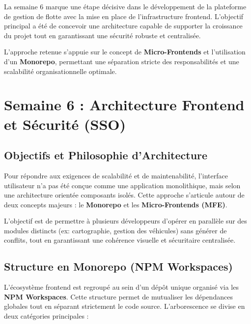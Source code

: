 \documentclass[12pt,a4paper]{article}
\begin{document}
La semaine 6 marque une \'{e}tape d\'{e}cisive dans le d\'{e}veloppement de la plateforme de gestion de flotte avec la mise en place de l'infrastructure frontend. L'objectif principal a \'{e}t\'{e} de concevoir une architecture capable de supporter la croissance du projet tout en garantissant une s\'{e}curit\'{e} robuste et centralis\'{e}e.

L'approche retenue s'appuie sur le concept de \textbf{Micro-Frontends} et l'utilisation d'un \textbf{Monorepo}, permettant une s\'{e}paration stricte des responsabilit\'{e}s et une scalabilit\'{e} organisationnelle optimale.

\section{Semaine 6 : Architecture Frontend et S\'{e}curit\'{e} (SSO)}

\subsection{Objectifs et Philosophie d'Architecture}

Pour r\'{e}pondre aux exigences de scalabilit\'{e} et de maintenabilit\'{e}, l'interface utilisateur n'a pas \'{e}t\'{e} con\c{c}ue comme une application monolithique, mais selon une architecture orient\'{e}e composants isol\'{e}s. Cette approche s'articule autour de deux concepts majeurs : le \textbf{Monorepo} et les \textbf{Micro-Frontends (MFE)}.

L'objectif est de permettre \`{a} plusieurs d\'{e}veloppeurs d'op\'{e}rer en parall\`{e}le sur des modules distincts (ex: cartographie, gestion des v\'{e}hicules) sans g\'{e}n\'{e}rer de conflits, tout en garantissant une coh\'{e}rence visuelle et s\'{e}curitaire centralis\'{e}e.

\subsection{Structure en Monorepo (NPM Workspaces)}

L'\'{e}cosyst\`{e}me frontend est regroup\'{e} au sein d'un d\'{e}p\^{o}t unique organis\'{e} via les \textbf{NPM Workspaces}. Cette structure permet de mutualiser les d\'{e}pendances globales tout en s\'{e}parant strictement le code source. L'arborescence se divise en deux cat\'{e}gories principales :
\end{document}
